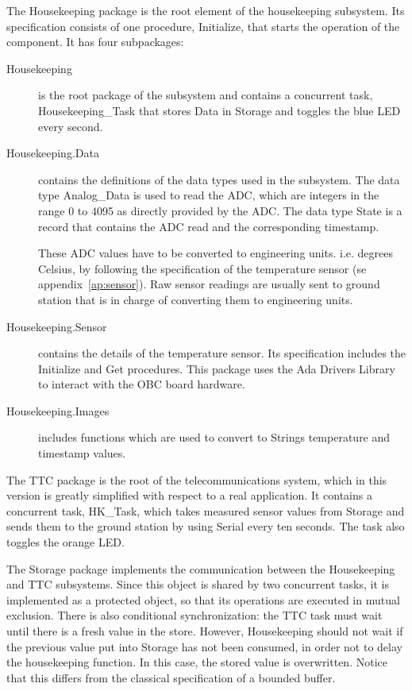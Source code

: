 The Housekeeping package is the root element of the housekeeping
subsystem. Its specification consists of one procedure, Initialize, that starts the operation of the component. It has four subpackages:
\begin{description}
\item[Housekeeping] is the root package of the subsystem and contains a concurrent task, Housekeeping\_Task that stores Data in Storage and toggles the blue LED every second.

\item[Housekeeping.Data] contains the definitions of the data types used in the subsystem. The data type Analog\_Data is used to read the ADC, which are integers in the range 0 to 4095 as directly provided by the ADC. The data type State is a record that contains the ADC read and the corresponding timestamp.

These ADC values have to be converted to engineering units. i.e. degrees Celsius, by following the specification of the temperature sensor (se appendix~\ref{ap:sensor}). Raw sensor readings are usually sent to ground station that is in charge of converting them to engineering units.

\item[Housekeeping.Sensor]  contains the details of the temperature sensor. Its specification includes the Initialize and Get procedures. This package uses the Ada Drivers Library to interact with the OBC board hardware.

\item[Housekeeping.Images] includes functions which are used to convert to Strings temperature and timestamp values.
\end{description}

The TTC package is the root of the telecommunications system, which in this version is greatly simplified with respect to a real application. It contains a concurrent task, HK\_Task, which takes measured sensor values from Storage and sends them to the ground station by using Serial every ten seconds. The task also toggles the orange LED.

The Storage package implements the communication between the Housekeeping and TTC subsystems.  Since this object is shared by two concurrent tasks, it is implemented as a protected object, so that its operations are executed in mutual exclusion. There is also conditional synchronization:
the TTC task must wait until there is a fresh value in the store. However, Housekeeping should not wait if the previous value put into Storage has not been consumed, in order not to delay the housekeeping function. In this case, the stored value is overwritten. Notice that this differs from the classical specification of a bounded buffer.

